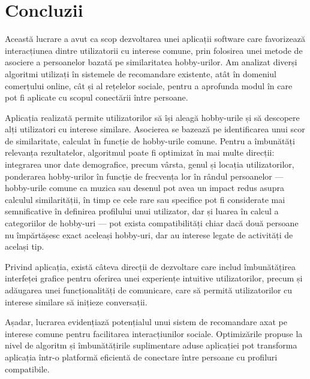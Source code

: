 \chapter{Concluzii}
\label{conclusions}

Această lucrare a avut ca scop dezvoltarea unei aplicații software care favorizează interacțiunea dintre utilizatorii cu interese comune, prin folosirea unei metode de asociere a persoanelor bazată pe similaritatea hobby-urilor.
Am analizat diverși algoritmi utilizați în sistemele de recomandare existente, atât în domeniul comerțului online, cât și al rețelelor sociale, pentru a aprofunda modul în care pot fi aplicate cu scopul conectării între persoane.
\par
Aplicația realizată permite utilizatorilor să își aleagă hobby-urile și să descopere alți utilizatori cu interese similare.
Asocierea se bazează pe identificarea unui scor de similaritate, calculat în funcție de hobby-urile comune.
Pentru a îmbunătăți relevanța rezultatelor, algoritmul poate fi optimizat în mai multe direcții: integrarea unor date demografice, precum vârsta, genul și locația utilizatorilor, ponderarea hobby-urilor în funcție de frecvența lor în rândul persoanelor --- hobby-urile comune ca muzica sau desenul pot avea un impact redus asupra calculul similarității, în timp ce cele rare sau specifice pot fi considerate mai semnificative în definirea profilului unui utilizator, dar și luarea în calcul a categoriilor de hobby-uri --- pot exista compatibilități chiar dacă două persoane nu împărtășesc exact aceleași hobby-uri, dar au interese legate de activități de același tip.
\par
Privind aplicația, există câteva direcții de dezvoltare care includ îmbunătățirea interfeței grafice pentru oferirea unei experiențe intuitive utilizatorilor, precum și adăugarea unei funcționalități de comunicare, care să permită utilizatorilor cu interese similare să inițieze conversații.
\par
Așadar, lucrarea evidențiază potențialul unui sistem de recomandare axat pe interese comune pentru facilitarea interacțiunilor sociale. 
Optimizările propuse la nivel de algoritm și îmbunătățirile suplimentare aduse aplicației pot transforma aplicația într-o platformă eficientă de conectare între persoane cu profiluri compatibile.